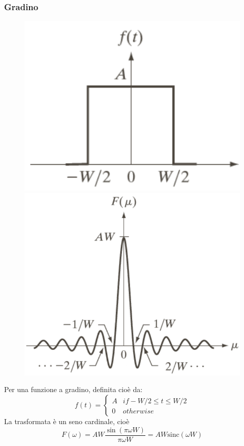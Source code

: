 \subsubsection{Gradino}\label{sec:gradino}
\begin{figure}
	\vspace{-1cm}
	\centering
	\includegraphics[width=.9\linewidth]{Picture/Step}
	\includegraphics[width=.9\linewidth]{Picture/Sinc}
\end{figure}
Per una funzione a gradino, definita cioè da:
\begin{equation}
	f(t) = 
	\begin{cases}
		A & if -W/2 \leq t \leq W/2\\
		0 & otherwise
	\end{cases}
\end{equation}
La trasformata è un seno cardinale, cioè
\begin{equation}
	F(\omega) = AW \frac{\sin(\pi\omega W)}{\pi\omega W} = AW\text{sinc}(\omega W)
\end{equation}
\vspace{-.2cm}
